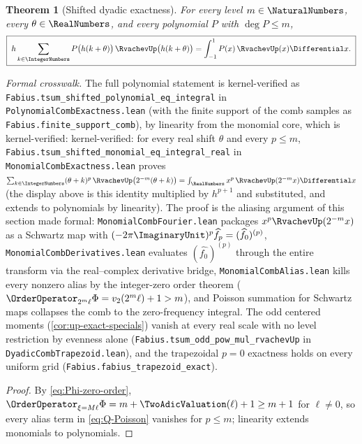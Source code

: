 \documentclass[11pt,oneside]{article}
\numberwithin{equation}{section}
\newtheorem{theorem}{Theorem}[section]
\theoremstyle{definition}
\theoremstyle{remark}
\begin{document}
\begin{theorem}[Shifted dyadic exactness]
\label{thm:shifted-exactness}
For every level $m\in\NaturalNumbers$, every $\theta\in\RealNumbers$, and every polynomial
$P$ with $\deg P\le m$,
\begin{equation}
 \boxed{\;
 h\sum_{k\in\IntegerNumbers}P\bigl(h(k+\theta)\bigr)\,
 \RvachevUp\bigl(h(k+\theta)\bigr)
 =\int_{-1}^{1}P(x)\,\RvachevUp(x)\Differential x.
 \;}
 \label{eq:polynomial-exactness}
\end{equation}
\end{theorem}

\emph{Formal crosswalk.}  The full polynomial statement is kernel-verified as
\nolinkurl{Fabius.tsum_shifted_polynomial_eq_integral} in
\nolinkurl{PolynomialCombExactness.lean} (with the finite support of the comb samples
as \nolinkurl{Fabius.finite_support_comb}), by linearity from the monomial core, which is
kernel-verified: kernel-verified: for
every real shift $\theta$ and every $p\le m$,
\nolinkurl{Fabius.tsum_shifted_monomial_eq_integral_real} in
\nolinkurl{MonomialCombExactness.lean} proves
$\sum_{k\in\IntegerNumbers}(\theta+k)^{p}\,\RvachevUp\bigl(2^{-m}(\theta+k)\bigr)=\int_\RealNumbers x^{p}\,\RvachevUp(2^{-m}x)\Differential x$
(the display above is this identity multiplied by $h^{p+1}$ and substituted, and
extends to polynomials by linearity).  The proof is the aliasing argument of this
section made formal: \nolinkurl{MonomialCombFourier.lean} packages $x^{p}\RvachevUp(2^{-m}x)$ as a
Schwartz map with $(-2\pi\ImaginaryUnit)^{p}\widehat{f_p}=(\widehat{f_0})^{(p)}$,
\nolinkurl{MonomialCombDerivatives.lean} evaluates $(\widehat{f_0})^{(p)}$ through the entire
transform via the real--complex derivative bridge, \nolinkurl{MonomialCombAlias.lean} kills
every nonzero alias by the integer-zero order theorem
($\OrderOperator_{2^{m}\ell}\Phi=v_2(2^{m}\ell)+1>m$),
and Poisson summation for Schwartz maps collapses the comb to the zero-frequency
integral.  The odd centered moments (\cref{cor:up-exact-specials}) vanish at every real
scale with no level restriction by evenness alone
(\nolinkurl{Fabius.tsum_odd_pow_mul_rvachevUp} in \nolinkurl{DyadicCombTrapezoid.lean}), and the
trapezoidal $p=0$ exactness holds on every uniform grid
(\nolinkurl{Fabius.fabius_trapezoid_exact}).

\begin{proof}
By \eqref{eq:Phi-zero-order},
$\OrderOperator_{\xi=M\ell}\Phi=m+\TwoAdicValuation(\ell)+1\ge m+1$ for
$\ell\ne0$, so every
alias term in \eqref{eq:Q-Poisson} vanishes for $p\le m$; linearity
extends monomials to polynomials.
\end{proof}
\end{document}
